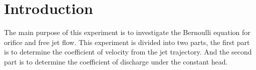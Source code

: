 \section{Introduction}
\label{sec:introduction}
\FloatBarrier %
The main purpose of this experiment is to investigate the Bernoulli equation for orifice and free jet flow.
This experiment is divided into two parts, the first part is to determine the coefficient of velocity from the jet trajectory.
And the second part is to determine the coefficient of discharge under the constant head.
